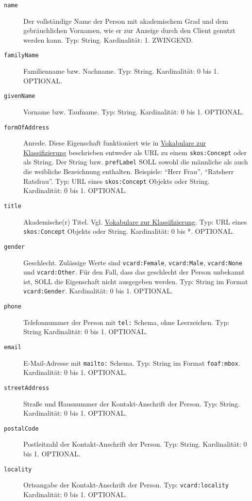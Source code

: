 \documentclass[,a4paper]{article}
\begin{document}
\begin{description}
\item[\texttt{name}]
Der vollständige Name der Person mit akademischem Grad und dem
gebräuchlichen Vornamen, wie er zur Anzeige durch den Client genutzt
werden kann. Typ: String. Kardinalität: 1. ZWINGEND.
\item[\texttt{familyName}]
Familienname bzw. Nachname. Typ: String. Kardinalität: 0 bis 1.
OPTIONAL.
\item[\texttt{givenName}]
Vorname bzw. Taufname. Typ: String. Kardinalität: 0 bis 1. OPTIONAL.
\item[\texttt{formOfAddress}]
Anrede. Diese Eigenschaft funktioniert wie in
\hyperref[vokabulareux5fklassifizierung]{Vokabulare zur Klassifizierung}
beschrieben entweder als URL zu einem \texttt{skos:Concept} oder als
String. Der String bzw. \texttt{prefLabel} SOLL sowohl die männliche als
auch die weibliche Bezeichnung enthalten. Beispiele: ``Herr \textbar{}
Frau'', ``Ratsherr \textbar{} Ratsfrau''. Typ: URL eines
\texttt{skos:Concept} Objekts oder String. Kardinalität: 0 bis 1.
OPTIONAL.
\item[\texttt{title}]
Akademische(r) Titel. Vgl.
\hyperref[vokabulareux5fklassifizierung]{Vokabulare zur
Klassifizierung}. Typ: URL eines \texttt{skos:Concept} Objekts oder
String. Kardinalität: 0 bis *. OPTIONAL.
\item[\texttt{gender}]
Geschlecht. Zulässige Werte sind \texttt{vcard:Female},
\texttt{vcard:Male}, \texttt{vcard:None} und \texttt{vcard:Other}. Für
den Fall, dass das geschlecht der Person unbekannt ist, SOLL die
Eigenschaft nicht ausgegeben werden. Typ: String im Format
\texttt{vcard:Gender}. Kardinalität: 0 bis 1. OPTIONAL.
\item[\texttt{phone}]
Telefonnummer der Person mit \texttt{tel:} Schema, ohne Leerzeichen.
Typ: String Kardinalität: 0 bis 1. OPTIONAL.
\item[\texttt{email}]
E-Mail-Adresse mit \texttt{mailto:} Schema. Typ: String im Format
\texttt{foaf:mbox}. Kardinalität: 0 bis 1. OPTIONAL.
\item[\texttt{streetAddress}]
Straße und Hausnummer der Kontakt-Anschrift der Person. Typ: String.
Kardinalität: 0 bis 1. OPTIONAL.
\item[\texttt{postalCode}]
Postleitzahl der Kontakt-Anschrift der Person. Typ: String.
Kardinalität: 0 bis 1. OPTIONAL.
\item[\texttt{locality}]
Ortsangabe der Kontakt-Anschrift der Person. Typ:
\texttt{vcard:locality} Kardinalität: 0 bis 1. OPTIONAL.

\end{description}
\end{document}
